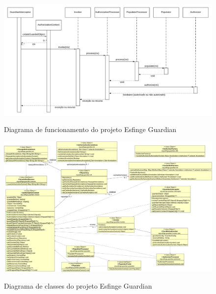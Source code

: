 \begin{landscape}

\begin{figure}
    \centering
    \caption{Diagrama de funcionamento do projeto Esfinge Guardian}
    \includegraphics[scale=0.2]{src/imagens/cap2/sequencia-guardian.png}
    \label{fig:diagrama-funcionamento-guardian}
\end{figure}

\begin{figure}
    \centering
    \caption{Diagrama de classes do projeto Esfinge Guardian}
    \includegraphics[scale=0.26]{src/imagens/cap2/guardian-core-class-diagram.png}
    \label{fig:guardian-diagrama-classe-cap2} %
\end{figure}

\end{landscape}
